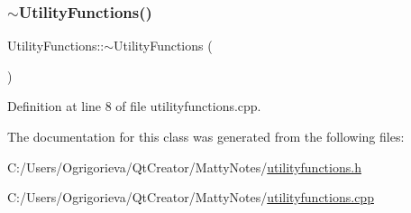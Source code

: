 \hypertarget{classUtilityFunctions_ab92ca1da946cc58713f6d06a4bcd0ff6}{}\label{classUtilityFunctions_ab92ca1da946cc58713f6d06a4bcd0ff6} 
\subsubsection{\texorpdfstring{$\sim$\+Utility\+Functions()}{~UtilityFunctions()}}
{\footnotesize\ttfamily Utility\+Functions\+::$\sim$\+Utility\+Functions (\begin{DoxyParamCaption}{ }\end{DoxyParamCaption})}



Definition at line 8 of file utilityfunctions.\+cpp.



The documentation for this class was generated from the following files\+:\begin{DoxyCompactItemize}
\item 
C\+:/\+Users/\+Ogrigorieva/\+Qt\+Creator/\+Matty\+Notes/\hyperlink{utilityfunctions_8h}{utilityfunctions.\+h}\item 
C\+:/\+Users/\+Ogrigorieva/\+Qt\+Creator/\+Matty\+Notes/\hyperlink{utilityfunctions_8cpp}{utilityfunctions.\+cpp}\end{DoxyCompactItemize}

